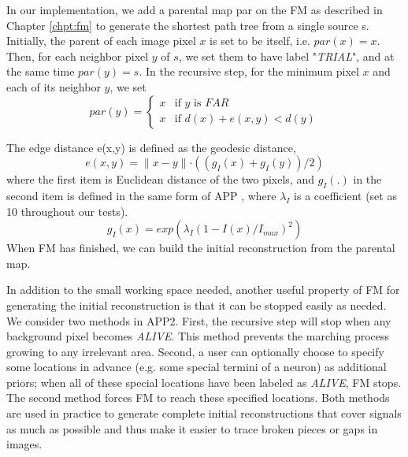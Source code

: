 In our implementation, we add a parental map par on the FM as described in Chapter \ref{chpt:fm} to generate the shortest path tree from a single source s.  Initially, the parent of each image pixel $x$ is set to be itself, i.e. $par(x)=x$. Then, for each neighbor pixel $y$ of $s$, we set them to have label "\emph{TRIAL}", and at the same time $par(y)=s$. In the recursive step, for the minimum pixel $x$ and each of its neighbor $y$, we set
\begin{equation}
par(y) = \left\{
\begin{array}{cl}
x & \mbox{if }y\mbox{ is }FAR \\
x & \mbox{if }d(x)+ e(x,y)< d(y)
\end{array}
\right.
\end{equation}

The edge distance e(x,y) is defined as the geodesic distance,
\begin{equation}
e(x,y)=\parallel x-y\parallel\cdot((g_I (x)+ g_I (y))/2)
\end{equation}
where the first item is Euclidean distance of the two pixels, and $g_I (.)$ in the second item is defined in the same form of APP \cite{peng2011automatic}, where $λ_I$ is a coefficient (set as 10 throughout our tests). 
\begin{equation}
g_I (x)=exp⁡(λ_I (1-I(x)/I_{max} )^2 )
\end{equation}
When FM has finished, we can build the initial reconstruction from the parental map.

In addition to the small working space needed, another useful property of FM for generating the initial reconstruction is that it can be stopped easily as needed. We consider two methods in APP2. First, the recursive step will stop when any background pixel becomes \emph{ALIVE}. This method prevents the marching process growing to any irrelevant area. Second, a user can optionally choose to specify some locations in advance (e.g. some special termini of a neuron) as additional priors; when all of these special locations have been labeled as \emph{ALIVE}, FM stops. The second method forces FM to reach these specified locations. Both methods are used in practice to generate complete initial reconstructions that cover signals as much as possible and thus make it easier to trace broken pieces or gaps in images. 

